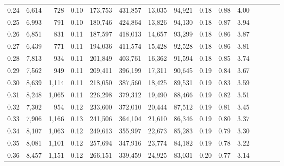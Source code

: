 \begin{tabular}{rrrcrrrrrrrrrrr}
0.24 &   6,614 &     728 &                                       0.10 &  173,753 &  431,857 &   13,035 &   94,921 &  0.18 &  0.88 &                         4.00 \\
0.25 &   6,993 &     791 &                                       0.10 &  180,746 &  424,864 &   13,826 &   94,130 &  0.18 &  0.87 &                         3.94 \\
0.26 &   6,851 &     831 &                                       0.11 &  187,597 &  418,013 &   14,657 &   93,299 &  0.18 &  0.86 &                         3.87 \\
0.27 &   6,439 &     771 &                                       0.11 &  194,036 &  411,574 &   15,428 &   92,528 &  0.18 &  0.86 &                         3.81 \\
0.28 &   7,813 &     934 &                                       0.11 &  201,849 &  403,761 &   16,362 &   91,594 &  0.18 &  0.85 &                         3.74 \\
0.29 &   7,562 &     949 &                                       0.11 &  209,411 &  396,199 &   17,311 &   90,645 &  0.19 &  0.84 &                         3.67 \\
0.30 &   8,639 &   1,114 &                                       0.11 &  218,050 &  387,560 &   18,425 &   89,531 &  0.19 &  0.83 &                         3.59 \\
0.31 &   8,248 &   1,065 &                                       0.11 &  226,298 &  379,312 &   19,490 &   88,466 &  0.19 &  0.82 &                         3.51 \\
0.32 &   7,302 &     954 &                                       0.12 &  233,600 &  372,010 &   20,444 &   87,512 &  0.19 &  0.81 &                         3.45 \\
0.33 &   7,906 &   1,166 &                                       0.13 &  241,506 &  364,104 &   21,610 &   86,346 &  0.19 &  0.80 &                         3.37 \\
0.34 &   8,107 &   1,063 &                                       0.12 &  249,613 &  355,997 &   22,673 &   85,283 &  0.19 &  0.79 &                         3.30 \\
0.35 &   8,081 &   1,101 &                                       0.12 &  257,694 &  347,916 &   23,774 &   84,182 &  0.19 &  0.78 &                         3.22 \\
0.36 &   8,457 &   1,151 &                                       0.12 &  266,151 &  339,459 &   24,925 &   83,031 &  0.20 &  0.77 &                         3.14 \\

\end{tabular}
